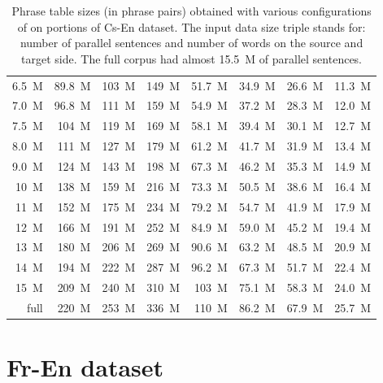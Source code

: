\begin{table}[!htb]
\begin{tabular}{ | r  r  r | r  r  r  r  r | }
6.5~M & 89.8~M & 103~M & 149~M & 51.7~M & 34.9~M & 26.6~M & 11.3~M \\
7.0~M & 96.8~M & 111~M & 159~M & 54.9~M & 37.2~M & 28.3~M & 12.0~M \\
7.5~M & 104~M & 119~M & 169~M & 58.1~M & 39.4~M & 30.1~M & 12.7~M \\
8.0~M & 111~M & 127~M & 179~M & 61.2~M & 41.7~M & 31.9~M & 13.4~M \\
9.0~M & 124~M & 143~M & 198~M & 67.3~M & 46.2~M & 35.3~M & 14.9~M \\
10~M & 138~M & 159~M & 216~M & 73.3~M & 50.5~M & 38.6~M & 16.4~M \\
11~M & 152~M & 175~M & 234~M & 79.2~M & 54.7~M & 41.9~M & 17.9~M \\
12~M & 166~M & 191~M & 252~M & 84.9~M & 59.0~M & 45.2~M & 19.4~M \\
13~M & 180~M & 206~M & 269~M & 90.6~M & 63.2~M & 48.5~M & 20.9~M \\
14~M & 194~M & 222~M & 287~M & 96.2~M & 67.3~M & 51.7~M & 22.4~M \\
15~M & 209~M & 240~M & 310~M & 103~M & 75.1~M & 58.3~M & 24.0~M \\
full & 220~M & 253~M & 336~M & 110~M & 86.2~M & 67.9~M & 25.7~M \\
\hline
\end{tabular}
\caption{\label{cs-en-output-size-benchmarking}
Phrase table sizes (in phrase pairs) obtained with various configurations of \eppex{}
on portions of Cs-En dataset. The input data size triple stands for: number of
parallel sentences and number of words on the source and target side.
The full corpus had almost 15.5~M of parallel sentences.}
\end{table}

\openright
\section{Fr-En dataset}

